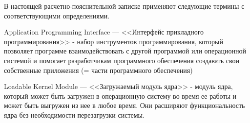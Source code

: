 
В настоящей расчетно-пояснительной записке применяют следующие термины с соответствующими определениями.\\

\begin{description}[leftmargin=0pt]
	\item \noindent Application Programming Interface --- <<Интерфейс прикладного программирования>> -
	набор инструментов программирования,
	который позволяет программе взаимодействовать с другой программой или операционной системой
	и помогает разработчикам программного обеспечения создавать свои собственные приложения
	(= части программного обеспечения)\cite{API-definition}\\
	\item \noindent Loadable Kernel Module --- <<Загружаемый модуль ядра>> -
	модуль ядра, который может быть загружен в операционную систему во время ее работы
	и может быть выгружен из нее в любое время.
	Они расширяют функциональность ядра без необходимости перезагрузки системы.\cite{LKM-definition}
\end{description}
